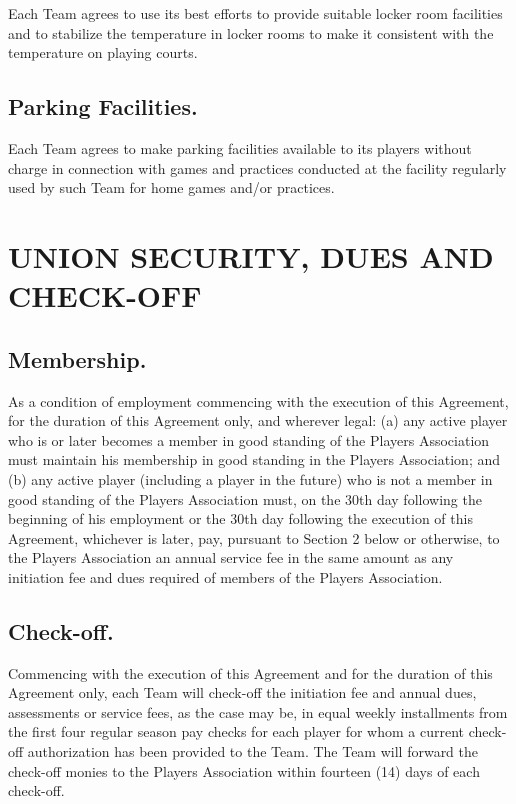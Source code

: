 \documentclass[
]{book}
\begin{document}
Each Team agrees to use its best efforts to provide suitable locker room facilities and to stabilize the temperature in locker rooms to make it consistent with the temperature on playing courts.

\hypertarget{parking-facilities.}{%
\section{Parking Facilities.}\label{parking-facilities.}}

Each Team agrees to make parking facilities available to its players without charge in connection with games and practices conducted at the facility regularly used by such Team for home games and/or practices.

\hypertarget{union-security-dues-and-check-off}{%
\chapter{UNION SECURITY, DUES AND CHECK-OFF}\label{union-security-dues-and-check-off}}

\hypertarget{membership.}{%
\section{Membership.}\label{membership.}}

As a condition of employment commencing with the execution of this Agreement, for the duration of this Agreement only, and wherever legal: (a) any active player who is or later becomes a member in good standing of the Players Association must maintain his membership in good standing in the Players Association; and (b) any active player (including a player in the future) who is not a member in good standing of the Players Association must, on the 30th day following the beginning of his employment or the 30th day following the execution of this Agreement, whichever is later, pay, pursuant to Section 2 below or otherwise, to the Players Association an annual service fee in the same amount as any initiation fee and dues required of members of the Players Association.

\hypertarget{check-off.}{%
\section{Check-off.}\label{check-off.}}

Commencing with the execution of this Agreement and for the duration of this Agreement only, each Team will check-off the initiation fee and annual dues, assessments or service fees, as the case may be, in equal weekly installments from the first four regular season pay checks for each player for whom a current check-off authorization has been provided to the Team. The Team will forward the check-off monies to the Players Association within fourteen (14) days of each check-off.
\end{document}
